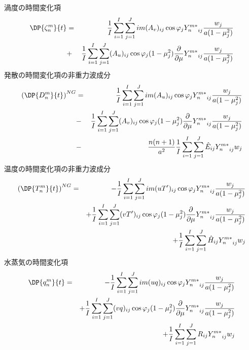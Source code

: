 渦度の時間変化項
\begin{eqnarray}
  \DP{\zeta_n^m}{t} 
  & = & \frac{1}{I} \sum_{i=1}^{I} \sum_{j=1}^{J}  
          im (A_v)_{ij} \cos \varphi_j
          {Y_n^{m *}}_{ij}
         \frac{w_j}{a(1-\mu_j^{2})} 
         \nonumber \\
  & + &   \frac{1}{I} \sum_{i=1}^{I} \sum_{j=1}^{J}  
          (A_u)_{ij} \cos \varphi_j
          (1-\mu_j^2) 
          \frac{\partial }{\partial \mu} {Y_n^{m *}}_{ij}
          \frac{w_j}{a(1-\mu_j^{2})} 
         \nonumber \\ 
\end{eqnarray}
%
発散の時間変化項の非重力波成分
\begin{eqnarray}
  \left( \DP{D_n^m}{t} \right)^{NG}
  & = & \frac{1}{I} \sum_{i=1}^{I} \sum_{j=1}^{J}  
          im (A_u)_{ij} \cos \varphi_j
          {Y_n^{m *}}_{ij}
         \frac{w_j}{a(1-\mu_j^{2})} 
         \nonumber \\
  & - &   \frac{1}{I} \sum_{i=1}^{I} \sum_{j=1}^{J}  
          (A_v)_{ij} \cos \varphi_j
          (1-\mu_j^2) 
          \frac{\partial }{\partial \mu} {Y_n^{m *}}_{ij}
          \frac{w_j}{a(1-\mu_j^{2})} 
         \nonumber \\
  & - &  \frac{n(n+1)}{a^{2}} 
         \frac{1}{I} \sum_{i=1}^{I} \sum_{j=1}^{J}  
          \hat{E}_{ij}  {Y_n^{m *}}_{ij} w_j
         \nonumber \\ 
\end{eqnarray}
%
温度の時間変化項の非重力波成分
\begin{eqnarray}
  \left( \DP{T_n^m}{t} \right)^{NG}
  & = & - \frac{1}{I} \sum_{i=1}^{I} \sum_{j=1}^{J}  
          im (u T')_{ij} \cos \varphi_j
          {Y_n^{m *}}_{ij}
         \frac{w_j}{a(1-\mu_j^{2})} 
         \nonumber \\
  &  & + \frac{1}{I} \sum_{i=1}^{I} \sum_{j=1}^{J}  
          (v T')_{ij} \cos \varphi_j
          (1-\mu_j^2) 
          \frac{\partial }{\partial \mu} {Y_n^{m *}}_{ij}
          \frac{w_j}{a(1-\mu_j^{2})} 
         \nonumber \\
  &  & + \frac{1}{I} \sum_{i=1}^{I} \sum_{j=1}^{J}  
          \hat{H}_{ij} 
          {Y_n^{m *}}_{ij} w_j
\end{eqnarray}
%
水蒸気の時間変化項
\begin{eqnarray}
  \DP{q_n^m}{t}
  & = & - \frac{1}{I} \sum_{i=1}^{I} \sum_{j=1}^{J}  
          im (uq)_{ij} \cos \varphi_j
          {Y_n^{m *}}_{ij}
         \frac{w_j}{a(1-\mu_j^{2})} 
         \nonumber \\
  &  & + \frac{1}{I} \sum_{i=1}^{I} \sum_{j=1}^{J}  
          (vq)_{ij} \cos \varphi_j
          (1-\mu_j^2) 
          \frac{\partial }{\partial \mu} {Y_n^{m *}}_{ij}
          \frac{w_j}{a(1-\mu_j^{2})} 
         \nonumber \\
  &  & + \frac{1}{I} \sum_{i=1}^{I} \sum_{j=1}^{J}  
          R_{ij} 
          {Y_n^{m *}}_{ij} w_j
\end{eqnarray}

